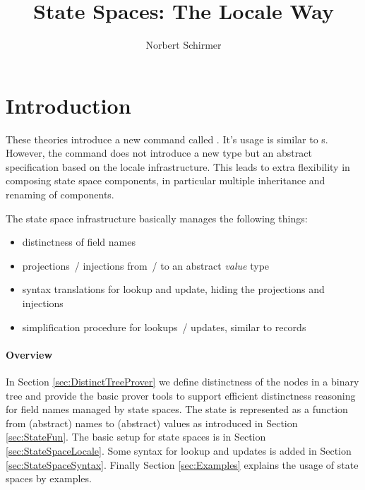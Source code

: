 \documentclass[11pt,a4paper]{article}
\begin{document}
\title{State Spaces: The Locale Way}
\author{Norbert Schirmer}
\maketitle

\tableofcontents


\section{Introduction}

These theories introduce a new command called . 
It's usage is similar to s. However, the command does not introduce a new type but an
abstract specification based on the locale infrastructure. This leads
to extra flexibility in composing state space components, in particular
multiple inheritance and renaming of components.

The state space infrastructure basically manages the following things:
\begin{itemize}
\item distinctness of field names
\item projections~/ injections from~/ to an abstract \emph{value} type
\item syntax translations for lookup and update, hiding the projections and injections
\item simplification procedure for lookups~/ updates, similar to records
\end{itemize}


\paragraph{Overview}
In Section \ref{sec:DistinctTreeProver} we define distinctness of the nodes in a binary tree and provide the basic prover tools to support efficient distinctness reasoning for field names managed by 
state spaces. The state is represented as a function from (abstract) names to (abstract) values as
introduced in Section \ref{sec:StateFun}. The basic setup for state spaces is in Section 
\ref{sec:StateSpaceLocale}. Some syntax for lookup and updates is added in Section \ref{sec:StateSpaceSyntax}. Finally Section \ref{sec:Examples} explains the usage of state spaces by examples.




%
%
\end{document}
